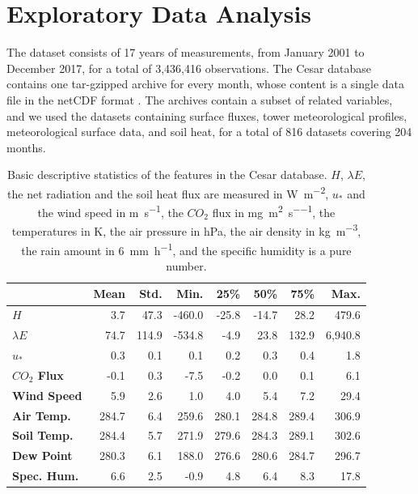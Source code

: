 \documentclass[a4paper,11pt]{kth-mag}
\begin{document}
\section{Exploratory Data Analysis}
\label{sec:eda}
The dataset consists of 17 years of measurements, from January 2001 to December 2017, for a total of 3,436,416 observations. The Cesar database contains one tar-gzipped archive for every month, whose content is a single data file in the netCDF format \citep{netcdf}. The archives contain a subset of related variables, and we used the datasets containing surface fluxes, tower meteorological profiles, meteorological surface  data, and soil heat, for a total of 816 datasets covering 204 months.


\begin{table}
\centering
\caption{Basic descriptive statistics of the features in the Cesar database. $H$, $\lambda E$, the net radiation and the soil heat flux are measured in \si{\watt\per\square\meter}, $u_*$ and the wind speed in \si{\meter\per\second}, the $CO_2$ flux in \si{\milli\gram\per\square\meter\per\second}, the temperatures in \si{\kelvin}, the air pressure in \si{\hecto\pascal}, the air density in \si{\kilo\gram\per\cubic\meter}, the rain amount in \SI{6}{\milli\meter\per\hour}, and the specific humidity is a pure number.}
\label{tbl:col_summary}
\begin{tabular*}{\textwidth}{l| @{\extracolsep{\fill}} rrrrrrr}
\toprule
& \textbf{Mean} & \textbf{Std.} & \textbf{Min.} & \textbf{25\%} & \textbf{50\%} & \textbf{75\%} & \textbf{Max.} \\ \midrule
\textbf{$H$} & 3.7 & 47.3 & -460.0 & -25.8 & -14.7 & 28.2 & 479.6 \\
\textbf{$\lambda E$} & 74.7 & 114.9 & -534.8 & -4.9 & 23.8 & 132.9 & 6,940.8 \\
\textbf{$u_*$} & 0.3 & 0.1 & 0.1 & 0.2 & 0.3 & 0.4 & 1.8  \\
\textbf{$CO_2$ Flux} & -0.1 & 0.3 & -7.5 & -0.2 & 0.0 & 0.1 & 6.1  \\
\hline
\textbf{Wind Speed} & 5.9 & 2.6 & 1.0 & 4.0 & 5.4 & 7.2 & 29.4  \\
\textbf{Air Temp.} & 284.7 & 6.4 & 259.6 & 280.1 & 284.8 & 289.4 & 306.9 \\
\textbf{Soil Temp.} & 284.4 & 5.7 & 271.9 & 279.6 & 284.3 & 289.1 & 302.6 \\ 
\textbf{Dew Point} & 280.3 & 6.1 & 188.0 & 276.6 & 280.6 & 284.7 & 296.7 \\
\textbf{Spec. Hum.} & 6.6 & 2.5 & -0.9 & 4.8 & 6.4 & 8.3 & 17.8 \\

\end{tabular*}
\end{table}
\end{document}
